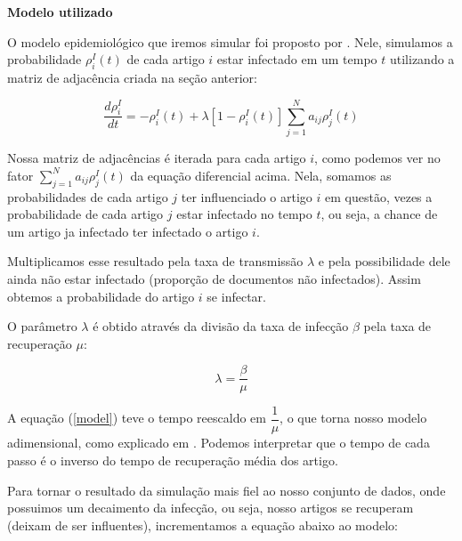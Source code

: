 \documentclass[a4paper,12pt]{article}
\begin{document}
 \begin{description}
  \item \textbf{Modelo utilizado}
  
    
    O modelo epidemiológico que iremos simular foi proposto por \citet[p. 940, eq. (33)]{pastor2014epidemic}. Nele,
    simulamos a probabilidade $\rho^{I}_{i}(t)$ de cada artigo $i$ estar infectado em um tempo $t$ utilizando a matriz de adjacência criada na seção anterior:

    \begin{equation}
      \dfrac{d\rho^{I}_{i}}{dt} = -\rho^{I}_{i}(t) + \lambda[1- \rho_{i}^{I}(t)] \sum_{j=1}^{N} a_{ij}\rho_{j}^{I}(t)
      \label{model}
    \end{equation}

    Nossa matriz de adjacências é iterada para cada artigo $i$, como podemos ver no fator $\sum_{j=1}^{N} a_{ij}\rho_{j}^{I}(t)$ da 
    equação diferencial acima. Nela, somamos as probabilidades de cada artigo $j$ ter influenciado o artigo $i$ em questão, vezes a probabilidade
    de cada artigo $j$ estar infectado no tempo $t$, ou seja, a chance de um artigo ja infectado ter infectado o artigo $i$.
    
    Multiplicamos esse resultado pela taxa de transmissão $\lambda$ e pela possibilidade dele ainda não estar infectado (proporção
    de documentos não infectados). Assim obtemos a probabilidade do artigo $i$ se infectar. 
    
    O parâmetro $\lambda$ é obtido através da divisão da taxa de infecção $\beta$ pela taxa de recuperação $\mu$:
    
    \begin{equation}
     \lambda = \dfrac{\beta}{\mu}
    \end{equation}
    
    A equação (\ref{model}) teve o tempo reescaldo em $\dfrac{1}{\mu}$, o que torna nosso modelo adimensional,
    como explicado em \citet[p. 939]{pastor2014epidemic}. Podemos interpretar que o tempo de cada passo é o inverso do tempo de 
    recuperação  média dos artigo. 
   
    Para tornar o resultado da simulação mais fiel ao nosso conjunto de dados, onde possuimos um decaimento da infecção, ou seja,
    nosso artigos se recuperam (deixam de ser influentes), incrementamos a equação abaixo ao modelo:
    

\end{description}
\end{document}
